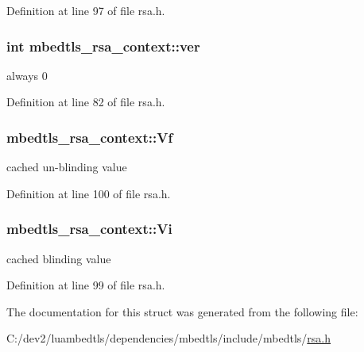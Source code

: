Definition at line 97 of file rsa.\-h.

\hypertarget{structmbedtls__rsa__context_a3b8683697a6f69c92860e078c934a4d9}{
\subsubsection[{ver}]{\setlength{\rightskip}{0pt plus 5cm}int mbedtls\-\_\-rsa\-\_\-context\-::ver}}\label{structmbedtls__rsa__context_a3b8683697a6f69c92860e078c934a4d9}
always 0 

Definition at line 82 of file rsa.\-h.

\hypertarget{structmbedtls__rsa__context_a5537a6306b03dbd02ba435738d660333}{
\subsubsection[{Vf}]{ mbedtls\-\_\-rsa\-\_\-context\-::\-Vf}}\label{structmbedtls__rsa__context_a5537a6306b03dbd02ba435738d660333}
cached un-\/blinding value 

Definition at line 100 of file rsa.\-h.

\hypertarget{structmbedtls__rsa__context_ae042ea2b11c2934694dbacb3656331ca}{
\subsubsection[{Vi}]{ mbedtls\-\_\-rsa\-\_\-context\-::\-Vi}}\label{structmbedtls__rsa__context_ae042ea2b11c2934694dbacb3656331ca}
cached blinding value 

Definition at line 99 of file rsa.\-h.



The documentation for this struct was generated from the following file\-:\begin{DoxyCompactItemize}
\item 
C\-:/dev2/luambedtls/dependencies/mbedtls/include/mbedtls/\hyperlink{rsa_8h}{rsa.\-h}\end{DoxyCompactItemize}
